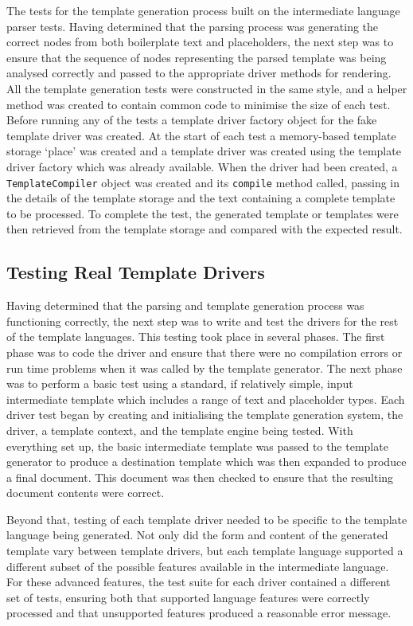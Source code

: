 The tests for the template generation process built on the intermediate language parser tests. Having determined that the parsing process was generating the correct nodes from both boilerplate text and placeholders, the next step was to ensure that the sequence of nodes representing the parsed template was being analysed correctly and passed to the appropriate driver methods for rendering. All the template generation tests were constructed in the same style, and a helper method was created to contain common code to minimise the size of each test. Before running any of the tests a template driver factory object for the fake template driver was created. At the start of each test a memory-based template storage `place' was created and a template driver was created using the template driver factory which was already available. When the driver had been created, a \verb!TemplateCompiler! object was created and its \verb!compile! method called, passing in the details of the template storage and the text containing a complete template to be processed. To complete the test, the generated template or templates were then retrieved from the template storage and compared with the expected result.

\subsection*{Testing Real Template Drivers}

Having determined that the parsing and template generation process was functioning correctly, the next step was to write and test the drivers for the rest of the template languages. This testing took place in several phases. The first phase was to code the driver and ensure that there were no compilation errors or run time problems when it was called by the template generator. The next phase was to perform a basic test using a standard, if relatively simple, input intermediate template which includes a range of text and placeholder types. Each driver test began by creating and initialising the template generation system, the driver, a template context, and the template engine being tested. With everything set up, the basic intermediate template was passed to the template generator to produce a destination template which was then expanded to produce a final document. This document was then checked to ensure that the resulting document contents were correct.

Beyond that, testing of each template driver needed to be specific to the template language being generated. Not only did the form and content of the generated template vary between template drivers, but each template language supported a different subset of the possible features available in the intermediate language. For these advanced features, the test suite for each driver contained a different set of tests, ensuring both that supported language features were correctly processed and that unsupported features produced a reasonable error message.

